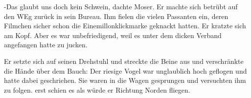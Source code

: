 -Das glaubt uns doch kein Schwein, dachte Moser. Er machte sich betrübt auf den WEg zurück in sein Bureau. Ihm fielen die vielen Passanten ein, deren Filmchen sicher schon die Einemillonklickmarke geknackt hatten. Er kratzte sich am Kopf. Aber es war unbefriedigend, weil es unter dem dicken Verband angefangen hatte zu jucken.

Er setzte sich auf seinen Drehstuhl und streckte die Beine aus und verschränkte die Hände über dem Bauch: Der riesige Vogel war unglaublich hoch geflogen und hatte dabei geschriehen. Sie waren in die Wagen gesprungen und versuchten ihm zu folgen. erst schien es als würde er Richtung Norden fliegen.  

  

